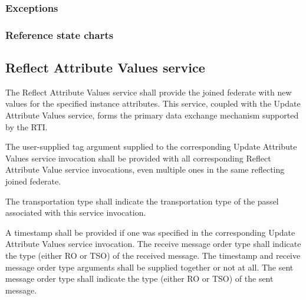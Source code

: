 \begin{compactstdpage}

    \subsubsection{Exceptions}



    \subsubsection{Reference state charts}



    \subsection{Reflect Attribute Values \rtiinitiated{} service}


    The Reflect Attribute Values \rtiinitiated{} service shall provide the joined federate with new values for the specified instance attributes. This service, coupled with the Update Attribute Values service, forms the primary data exchange mechanism supported by the RTI.


    The user-supplied tag argument supplied to the corresponding Update Attribute Values service invocation shall be provided with all corresponding Reflect Attribute Value \rtiinitiated{} service invocations, even multiple ones in the same reflecting joined federate.


    The transportation type shall indicate the transportation type of the passel associated with this service invocation.


    A timestamp shall be provided if one was specified in the corresponding Update Attribute Values service invocation. The receive message order type shall indicate the type (either RO or TSO) of the received message. The timestamp and receive message order type arguments shall be supplied together or not at all. The sent message order type shall indicate the type (either RO or TSO) of the sent message.



\end{compactstdpage}

